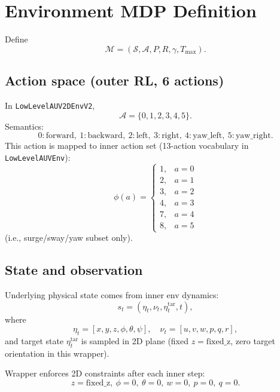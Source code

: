 \documentclass[11pt]{article}
\begin{document}
\section{Environment MDP Definition}
Define
\begin{equation}
\mathcal{M}=(\mathcal{S},\mathcal{A},P,R,\gamma,T_{\max}).
\end{equation}

\subsection{Action space (outer RL, 6 actions)}
In \texttt{LowLevelAUV2DEnvV2},
\begin{equation}
\mathcal{A}=\{0,1,2,3,4,5\}.
\end{equation}
Semantics:
\[
0:\text{forward},\ 1:\text{backward},\ 2:\text{left},\ 3:\text{right},\ 4:\text{yaw\_left},\ 5:\text{yaw\_right}.
\]
This action is mapped to inner action set (13-action vocabulary in \texttt{LowLevelAUVEnv}):
\begin{equation}
\phi(a)=
\begin{cases}
1,&a=0\\
2,&a=1\\
3,&a=2\\
4,&a=3\\
7,&a=4\\
8,&a=5
\end{cases}
\end{equation}
(i.e., surge/sway/yaw subset only).

\subsection{State and observation}
Underlying physical state comes from inner env dynamics:
\begin{equation}
s_t=(\eta_t,\nu_t,\eta_t^{\mathrm{tar}},t),
\end{equation}
where
\[
\eta_t=[x,y,z,\phi,\theta,\psi],\quad \nu_t=[u,v,w,p,q,r],
\]
and target state \(\eta_t^{\mathrm{tar}}\) is sampled in 2D plane (fixed \(z=\text{fixed\_z}\), zero target orientation in this wrapper).

Wrapper enforces 2D constraints after each inner step:
\[
z=\text{fixed\_z},\ \phi=0,\ \theta=0,\ w=0,\ p=0,\ q=0.
\]
\end{document}

